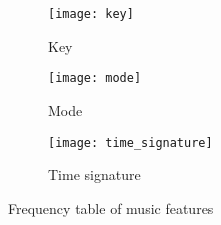 \begin{figure}
  \begin{subfigure}[b]{0.3\textwidth}
    \texttt{[image: key]}
    \caption{Key}
    \label{fig:key}
  \end{subfigure}
  \hfill
   \begin{subfigure}[b]{0.3\textwidth}
    \texttt{[image: mode]}
    \caption{Mode}
    \label{fig:mode}
  \end{subfigure}
  \hfill
  \begin{subfigure}[b]{0.3\textwidth}
    \texttt{[image: time\_signature]}
    \caption{Time signature}
    \label{fig:time_signature}
  \end{subfigure}
	
	\caption{Frequency table of music features}
	\label{fig:freq_table}
\end{figure}

\bigskip

